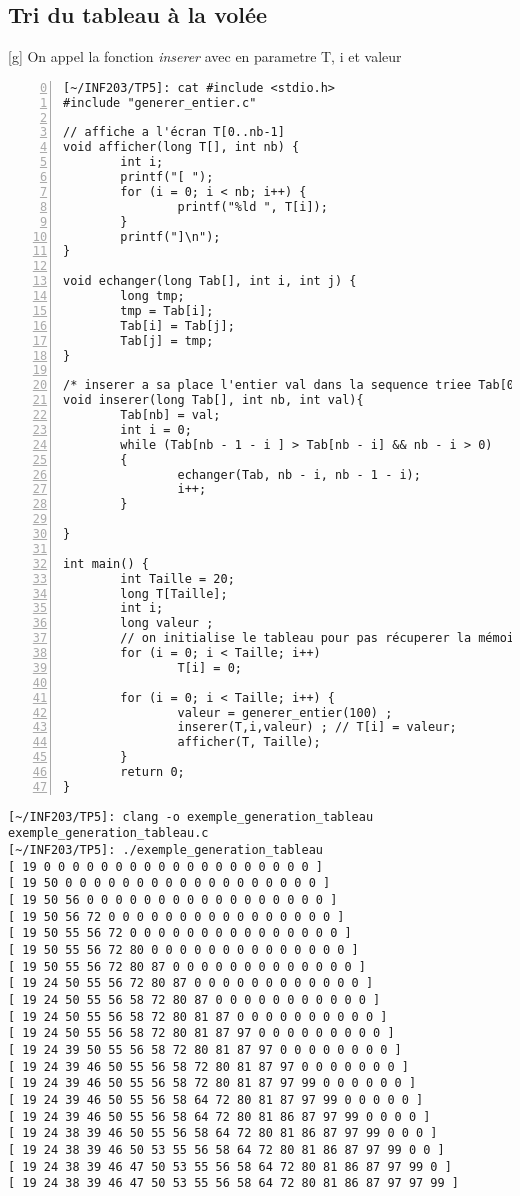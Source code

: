 \documentclass[12pt,a4paper,notitlepage,colorinlistoftodos]{article}
\begin{document}
\newpage
\subsection{Tri du tableau à la volée}

[g]
On appel la fonction \textit{inserer} avec en parametre T, i et valeur

\begin{lstlisting}[numbers=left, firstnumber = 0 ]
[~/INF203/TP5]: cat #include <stdio.h>
#include "generer_entier.c"

// affiche a l'écran T[0..nb-1]
void afficher(long T[], int nb) {
        int i;
        printf("[ ");
        for (i = 0; i < nb; i++) {
                printf("%ld ", T[i]);
        }
        printf("]\n");
}

void echanger(long Tab[], int i, int j) {
        long tmp;
        tmp = Tab[i];
        Tab[i] = Tab[j];
        Tab[j] = tmp;
}

/* inserer a sa place l'entier val dans la sequence triee Tab[0..nb-1] */
void inserer(long Tab[], int nb, int val){
        Tab[nb] = val;
        int i = 0;
        while (Tab[nb - 1 - i ] > Tab[nb - i] && nb - i > 0)
        {
                echanger(Tab, nb - i, nb - 1 - i);
                i++; 
        }
        
}

int main() {
        int Taille = 20;
        long T[Taille];
        int i;
        long valeur ;
        // on initialise le tableau pour pas récuperer la mémoire précédente
        for (i = 0; i < Taille; i++) 
                T[i] = 0;

        for (i = 0; i < Taille; i++) {
                valeur = generer_entier(100) ;
                inserer(T,i,valeur) ; // T[i] = valeur;
                afficher(T, Taille);
        }
        return 0;
}
\end{lstlisting}
        
\newpage        
\begin{lstlisting}
[~/INF203/TP5]: clang -o exemple_generation_tableau exemple_generation_tableau.c
[~/INF203/TP5]: ./exemple_generation_tableau 
[ 19 0 0 0 0 0 0 0 0 0 0 0 0 0 0 0 0 0 0 0 ]
[ 19 50 0 0 0 0 0 0 0 0 0 0 0 0 0 0 0 0 0 0 ]
[ 19 50 56 0 0 0 0 0 0 0 0 0 0 0 0 0 0 0 0 0 ]
[ 19 50 56 72 0 0 0 0 0 0 0 0 0 0 0 0 0 0 0 0 ]
[ 19 50 55 56 72 0 0 0 0 0 0 0 0 0 0 0 0 0 0 0 ]
[ 19 50 55 56 72 80 0 0 0 0 0 0 0 0 0 0 0 0 0 0 ]
[ 19 50 55 56 72 80 87 0 0 0 0 0 0 0 0 0 0 0 0 0 ]
[ 19 24 50 55 56 72 80 87 0 0 0 0 0 0 0 0 0 0 0 0 ]
[ 19 24 50 55 56 58 72 80 87 0 0 0 0 0 0 0 0 0 0 0 ]
[ 19 24 50 55 56 58 72 80 81 87 0 0 0 0 0 0 0 0 0 0 ]
[ 19 24 50 55 56 58 72 80 81 87 97 0 0 0 0 0 0 0 0 0 ]
[ 19 24 39 50 55 56 58 72 80 81 87 97 0 0 0 0 0 0 0 0 ]
[ 19 24 39 46 50 55 56 58 72 80 81 87 97 0 0 0 0 0 0 0 ]
[ 19 24 39 46 50 55 56 58 72 80 81 87 97 99 0 0 0 0 0 0 ]
[ 19 24 39 46 50 55 56 58 64 72 80 81 87 97 99 0 0 0 0 0 ]
[ 19 24 39 46 50 55 56 58 64 72 80 81 86 87 97 99 0 0 0 0 ]
[ 19 24 38 39 46 50 55 56 58 64 72 80 81 86 87 97 99 0 0 0 ]
[ 19 24 38 39 46 50 53 55 56 58 64 72 80 81 86 87 97 99 0 0 ]
[ 19 24 38 39 46 47 50 53 55 56 58 64 72 80 81 86 87 97 99 0 ]
[ 19 24 38 39 46 47 50 53 55 56 58 64 72 80 81 86 87 97 97 99 ]
\end{lstlisting}
\end{document}
